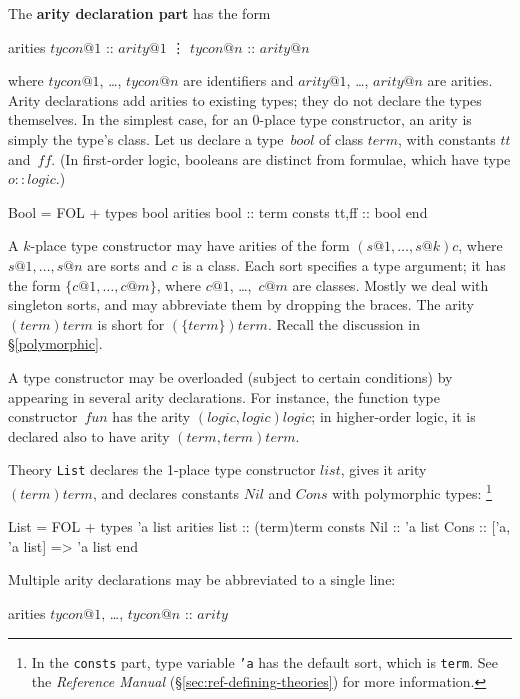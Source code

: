 The {\bf arity declaration part} has the form
\begin{ttbox}
arities \(tycon@1\) :: \(arity@1\)
        \vdots
        \(tycon@n\) :: \(arity@n\)
\end{ttbox}
where $tycon@1$, \ldots, $tycon@n$ are identifiers and $arity@1$, \ldots,
$arity@n$ are arities.  Arity declarations add arities to existing
types; they do not declare the types themselves.
In the simplest case, for an 0-place type constructor, an arity is simply
the type's class.  Let us declare a type~$bool$ of class $term$, with
constants $tt$ and~$ff$.  (In first-order logic, booleans are
distinct from formulae, which have type $o::logic$.)
\begin{ttbox}
Bool = FOL +
types   bool
arities bool    :: term
consts  tt,ff   :: bool
end
\end{ttbox}
A $k$-place type constructor may have arities of the form
$(s@1,\ldots,s@k)c$, where $s@1,\ldots,s@n$ are sorts and $c$ is a class.
Each sort specifies a type argument; it has the form $\{c@1,\ldots,c@m\}$,
where $c@1$, \dots,~$c@m$ are classes.  Mostly we deal with singleton
sorts, and may abbreviate them by dropping the braces.  The arity
$(term)term$ is short for $(\{term\})term$.  Recall the discussion in
\S\ref{polymorphic}.

A type constructor may be overloaded (subject to certain conditions) by
appearing in several arity declarations.  For instance, the function type
constructor~$fun$ has the arity $(logic,logic)logic$; in higher-order
logic, it is declared also to have arity $(term,term)term$.

Theory {\tt List} declares the 1-place type constructor $list$, gives
it arity $(term)term$, and declares constants $Nil$ and $Cons$ with
polymorphic types:%
\footnote{In the {\tt consts} part, type variable {\tt'a} has the default
  sort, which is {\tt term}.  See the {\em Reference Manual\/}
%
{(\S\ref{sec:ref-defining-theories})} for more information.}
\begin{ttbox}
List = FOL +
types   'a list
arities list    :: (term)term
consts  Nil     :: 'a list
        Cons    :: ['a, 'a list] => 'a list
end
\end{ttbox}
Multiple arity declarations may be abbreviated to a single line:
\begin{ttbox}
arities \(tycon@1\), \ldots, \(tycon@n\) :: \(arity\)
\end{ttbox}

